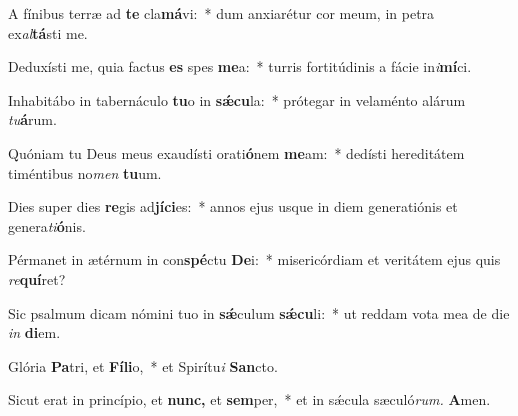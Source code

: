 \item A fínibus terræ ad \textbf{te} cla\textbf{má}vi:~* dum anxiarétur cor meum, in petra\\ ex\hspace{0.03em}\textit{al}\textbf{tá}sti me.
\item Deduxísti me, quia factus \textbf{es} spes \textbf{me}a:~* turris fortitúdinis a fácie in\textit{i}\textbf{mí}ci.
\item Inhabitábo in tabernáculo \textbf{tu}o in \textbf{sǽ}\textbf{cu}la:~* prótegar in velaménto alárum \textit{tu}\textbf{á}rum.
\item Quóniam tu Deus meus exaudísti orati\textbf{ó}nem \textbf{me}am:~* dedísti hereditátem timéntibus no\textit{men} \textbf{tu}um.
\item Dies super dies \textbf{re}gis ad\textbf{jí}\textbf{ci}es:~* annos ejus usque in diem generatiónis et genera\hspace{0.03em}\textit{ti}\textbf{ó}nis.
\item Pérmanet in ætérnum in con\textbf{spé}ctu \textbf{De}i:~* misericórdiam et veritátem ejus quis \textit{re}\textbf{quí}ret?
\item Sic psalmum dicam nómini tuo in \textbf{sǽ}culum \textbf{sǽ}\textbf{cu}li:~* ut reddam vota mea de die \textit{in} \textbf{di}em.
\item Glória \textbf{Pa}tri, et \textbf{Fí}\textbf{li}o,~* et Spirítu\textit{i} \textbf{San}cto.
\item Sicut erat in princípio, et \textbf{nunc,} et \textbf{sem}per,~* et in sǽcula sæculó\textit{rum.} \textbf{A}men.
